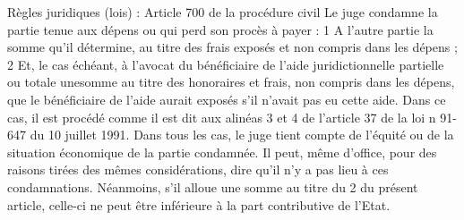 Règles juridiques (lois) :
Article 700 de la procédure civil
Le juge condamne la partie tenue aux dépens ou qui perd son procès à payer :
1 A l'autre partie la somme qu'il détermine, au titre des frais exposés et non compris dans les
dépens ;
2 Et, le cas échéant, à l'avocat du bénéficiaire de l'aide juridictionnelle partielle ou totale unesomme au titre des honoraires et frais, non compris dans les dépens, que le bénéficiaire de l'aide
aurait exposés s'il n'avait pas eu cette aide. Dans ce cas, il est procédé comme il est dit aux alinéas 3
et 4 de l'article 37 de la loi n 91-647 du 10 juillet 1991.
Dans tous les cas, le juge tient compte de l'équité ou de la situation économique de la partie
condamnée. Il peut, même d'office, pour des raisons tirées des mêmes considérations, dire qu'il n'y a pas lieu à ces condamnations. Néanmoins, s'il alloue une somme au titre du 2 du présent article,
celle-ci ne peut être inférieure à la part contributive de l'Etat.